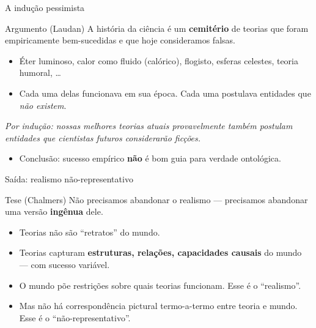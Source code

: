 \documentclass[aspectratio=169]{beamer}
\newcommand{\impt}[1]{\textcolor{maccent}{\textbf{#1}}}
\newcommand{\ntc}[1]{\textcolor{mprimary}{#1}}
\begin{document}
\begin{frame}{A indu\c c\~ao pessimista}
\begin{block}{Argumento (Laudan)}
A hist\'oria da ci\^encia \'e um \impt{cemit\'erio} de teorias que foram empiricamente bem-sucedidas e que hoje consideramos \ntc{falsas}.
\end{block}
\vspace{0.2cm}
\begin{itemize}
    \item \'Eter luminoso, calor como fluido (cal\'orico), flogisto, esferas celestes, teoria humoral, \ldots
    \item Cada uma delas funcionava em sua \'epoca. Cada uma postulava entidades que \emph{n\~ao existem}.
\end{itemize}
\vspace{0.4cm}
\begin{center}
\itshape Por indu\c c\~ao: nossas melhores teorias atuais provavelmente tamb\'em postulam \\ entidades que cientistas futuros considerar\~ao fic\c c\~oes.
\end{center}
\vspace{0.3cm}
\begin{itemize}
    \item Conclus\~ao: sucesso emp\'irico \impt{n\~ao} \'e bom guia para verdade ontol\'ogica.
\end{itemize}
\end{frame}

\begin{frame}{Sa\'ida: realismo n\~ao-representativo}
\begin{block}{Tese (Chalmers)}
N\~ao precisamos abandonar o realismo --- precisamos abandonar uma vers\~ao \impt{ing\^enua} dele.
\end{block}
\vspace{0.3cm}
\begin{itemize}
    \item Teorias n\~ao s\~ao ``retratos'' do mundo.
    \item Teorias capturam \impt{estruturas, rela\c c\~oes, capacidades causais} do mundo --- com sucesso vari\'avel.
    \item O mundo p\~oe \ntc{restri\c c\~oes} sobre quais teorias funcionam. Esse \'e o ``realismo''.
    \item Mas n\~ao h\'a correspond\^encia pictural termo-a-termo entre teoria e mundo. Esse \'e o ``n\~ao-representativo''.
\end{itemize}
\end{frame}
\end{document}
